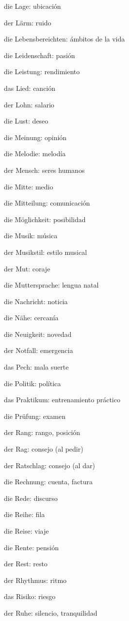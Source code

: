 \begin{multicols}{2}
\begin{myitemize}
\item die Lage: ubicación
\item der Lärm: ruido
\item die Lebensbereichten: ámbitos de la vida
\item die Leidenschaft: pasión
\item die Leistung: rendimiento
\item das Lied: canción
\item der Lohn: salario
\item die Lust: deseo
\item die Meinung: opinión
\item die Melodie: melodía
\item der Mensch: seres humanos
\item die Mitte: medio
\item die Mitteilung: comunicación
\item die Möglichkeit: posibilidad
\item die Musik: música
\item der Musikstil: estilo musical
\item der Mut: coraje
\item die Muttersprache: lengua natal
\item die Nachricht: noticia
\item die Nähe: cercanía
\item die Neuigkeit: novedad
\item der Notfall: emergencia
\item das Pech: mala suerte
\item die Politik: política
\item das Praktikum: entrenamiento práctico
\item die Prüfung: examen
\item der Rang: rango, posición
\item der Rag: consejo (al pedir)
\item der Ratschlag: consejo (al dar)
\item die Rechnung: cuenta, factura
\item die Rede: discurso
\item die Reihe: fila
\item die Reise: viaje
\item die Rente: pensión
\item der Rest: resto
\item der Rhythmus: ritmo
\item das Risiko: riesgo
\item der Ruhe: silencio, tranquilidad

\end{myitemize}
\end{multicols}
